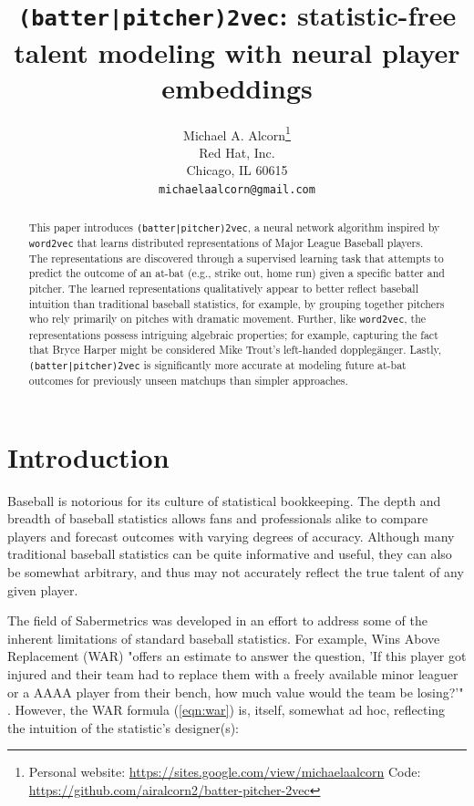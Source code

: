\documentclass{article}
\title{\texttt{(batter|pitcher)2vec}: statistic-free talent modeling with neural player embeddings}
\date{}
\author{
    Michael A. Alcorn\thanks
    {Personal website: \url{https://sites.google.com/view/michaelaalcorn}\newline
    \hspace*{1.8em}Code: \url{https://github.com/airalcorn2/batter-pitcher-2vec}} \\
    Red Hat, Inc.\\
    Chicago, IL 60615 \\
    \texttt{michaelaalcorn@gmail.com} \\
}
\begin{document}
\maketitle

\begin{abstract}

This paper introduces \texttt{(batter|pitcher)2vec}, a neural network algorithm inspired by \texttt{word2vec} that learns distributed representations of Major League Baseball players. The representations are discovered through a supervised learning task that attempts to predict the outcome of an at-bat (e.g., strike out, home run) given a specific batter and pitcher. The learned representations qualitatively appear to better reflect baseball intuition than traditional baseball statistics, for example, by grouping together pitchers who rely primarily on pitches with dramatic movement. Further, like \texttt{word2vec}, the representations possess intriguing algebraic properties; for example, capturing the fact that Bryce Harper might be considered Mike Trout's left-handed dopplegänger. Lastly, \texttt{(batter|pitcher)2vec} is significantly more accurate at modeling future at-bat outcomes for previously unseen matchups than simpler approaches.

\end{abstract}

\section{Introduction}

Baseball is notorious for its culture of statistical bookkeeping. The depth and breadth of baseball statistics allows fans and professionals alike to compare players and forecast outcomes with varying degrees of accuracy. Although many traditional baseball statistics can be quite informative and useful, they can also be somewhat arbitrary, and thus may not accurately reflect the true talent of any given player.

The field of Sabermetrics was developed in an effort to address some of the inherent limitations of standard baseball statistics. For example, Wins Above Replacement (WAR) "offers an estimate to answer the question, 'If this player got injured and their team had to replace them with a freely available minor leaguer or a AAAA player from their bench, how much value would the team be losing?'" \parencite{WAR}. However, the WAR formula (\ref{eqn:war}) is, itself, somewhat ad hoc, reflecting the intuition of the statistic's designer(s):
\end{document}
